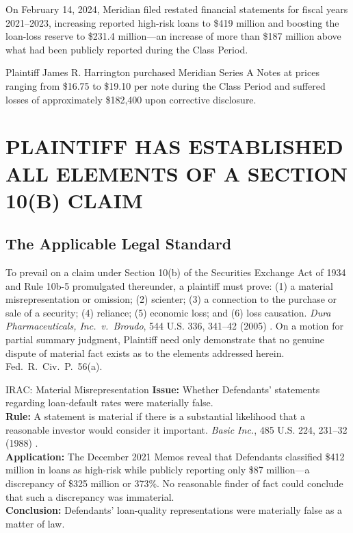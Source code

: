 \documentclass[12pt,letterpaper]{article}
\newcommand{\caseref}[5]{%
  \textit{#1}, #2 #3 #4 (#5)%
}
\begin{document}
\begin{factlist}
\item On February 14, 2024, Meridian filed restated financial statements for fiscal years 2021--2023, increasing reported high-risk loans to \$419 million and boosting the loan-loss reserve to \$231.4 million---an increase of more than \$187 million above what had been publicly reported during the Class Period.

\item Plaintiff James R. Harrington purchased Meridian Series A Notes at prices ranging from \$16.75 to \$19.10 per note during the Class Period and suffered losses of approximately \$182,400 upon corrective disclosure.

\end{factlist}


\section{PLAINTIFF HAS ESTABLISHED ALL ELEMENTS OF A SECTION 10(B) CLAIM}

\subsection{The Applicable Legal Standard}

To prevail on a claim under Section 10(b) of the Securities Exchange Act of 1934 and Rule 10b-5 promulgated thereunder, a plaintiff must prove: (1) a material misrepresentation or omission; (2) scienter; (3) a connection to the purchase or sale of a security; (4) reliance; (5) economic loss; and (6) loss causation. \caseref{Dura Pharmaceuticals, Inc.\ v.\ Broudo}{544}{U.S.}{336, 341--42}{2005}. On a motion for partial summary judgment, Plaintiff need only demonstrate that no genuine dispute of material fact exists as to the elements addressed herein. Fed.\ R.\ Civ.\ P.\ 56(a).

\begin{iracblock}{IRAC: Material Misrepresentation}
\textbf{Issue:} Whether Defendants' statements regarding loan-default rates were materially false.\\[4pt]
\textbf{Rule:} A statement is material if there is a substantial likelihood that a reasonable investor would consider it important. \caseref{Basic Inc.}{485}{U.S.}{224, 231--32}{1988}.\\[4pt]
\textbf{Application:} The December 2021 Memos reveal that Defendants classified \$412 million in loans as high-risk while publicly reporting only \$87 million---a discrepancy of \$325 million or 373\%. No reasonable finder of fact could conclude that such a discrepancy was immaterial.\\[4pt]
\textbf{Conclusion:} Defendants' loan-quality representations were materially false as a matter of law.
\end{iracblock}
\end{document}
